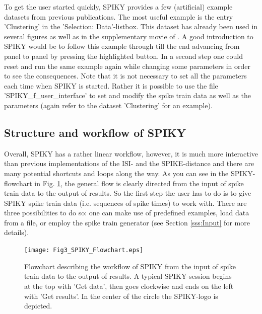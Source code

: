 \documentclass[10pt,twocolumn]{elsart5p}
\begin{document}
To get the user started quickly, SPIKY provides a few (artificial) example datasets from previous publications. The most useful example is the entry 'Clustering' in the 'Selection: Data'-listbox. This dataset has already been used in several figures as well as in the supplementary movie of \cite{Kreuz13}. A good introduction to SPIKY would be to follow this example through till the end advancing from panel to panel by pressing the highlighted button. In a second step one could reset and run the same example again while changing some parameters in order to see the consequences. Note that it is not necessary to set all the parameters each time when SPIKY is started. Rather it is possible to use the file 'SPIKY\_f\_user\_interface' to set and modify the spike train data as well as the parameters (again refer to the dataset 'Clustering' for an example).


\subsection{\label{ss:Structure} Structure and workflow of SPIKY}

Overall, SPIKY has a rather linear workflow, however, it is much more interactive than previous implementations of the ISI- and the SPIKE-distance and there are many potential shortcuts and loops along the way. As you can see in the SPIKY-flowchart in Fig. \ref{fig:Fig3-SPIKY-Flowchart}, the general flow is clearly directed from the input of spike train data to the output of results. So the first step the user has to do is to give SPIKY spike train data (i.e. sequences of spike times) to work with. There are three possibilities to do so: one can make use of predefined examples, load data from a file, or employ the spike train generator (see Section \ref{sss:Input} for more details).
%
%
\begin{figure}
    \texttt{[image: Fig3\_SPIKY\_Flowchart.eps]}
    \caption{\abb\label{fig:Fig3-SPIKY-Flowchart} Flowchart describing the workflow of SPIKY from 	the input of spike train data to the output of results. A typical SPIKY-session begins at the top with 'Get data', then goes clockwise and ends on the left with 'Get results'. In the center of the circle the SPIKY-logo is depicted.}
\end{figure}
%
\end{document}
